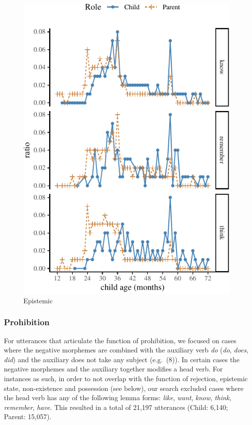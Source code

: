 \documentclass[10pt, letterpaper]{article}
\newenvironment{CodeChunk}{}{}
\begin{document}
\begin{CodeChunk}
\begin{figure}[H]

{\centering \includegraphics{figs/epistemic-1} 

}

\caption[Epistemic]{Epistemic}\label{fig:epistemic}
\end{figure}
\end{CodeChunk}

\hypertarget{prohibition}{%
\subsubsection{Prohibition}\label{prohibition}}

For utterances that articulate the function of prohibition, we focused
on cases where the negative morphemes are combined with the auxiliary
verb \emph{do} (\emph{do}, \emph{does}, \emph{did}) and the auxiliary
does not take any subject (e.g.~(8)). In certain cases the negative
morphemes and the auxiliary together modifies a head verb. For instances
as such, in order to not overlap with the function of rejection,
epistemic state, non-existence and possession (see below), our search
excluded cases where the head verb has any of the following lemma forms:
\emph{like}, \emph{want}, \emph{know}, \emph{think}, \emph{remember},
\emph{have}. This resulted in a total of 21,197 utterances (Child:
6,140; Parent: 15,057).
\end{document}
